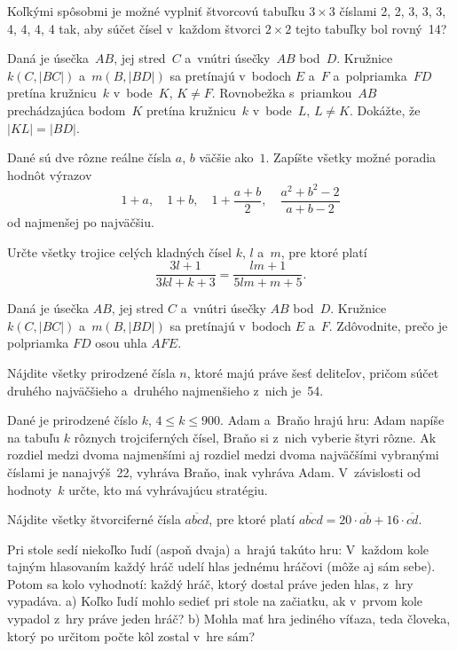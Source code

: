 {%
Koľkými spôsobmi je možné vyplniť štvorcovú tabuľku $3 \times 3$
číslami 2, 2, 3, 3, 3, 4, 4, 4, 4 tak, aby súčet čísel
v~každom štvorci $2 \times 2$ tejto tabuľky bol rovný~14?}

{%
Daná je úsečka~$AB$, jej stred~$C$ a~vnútri úsečky~$AB$ bod~$D$. Kružnice
$k(C, |BC|)$ a~$m(B, |BD|)$ sa pretínajú v~bodoch $E$ a~$F$ a~polpriamka~$FD$ pretína kružnicu~$k$ v~bode~$K$, $K\ne F$. Rovnobežka
s~priamkou~$AB$ prechádzajúca bodom~$K$ pretína kružnicu~$k$ v~bode~$L$, $L \ne K$.
Dokážte, že $|KL| = |BD|$.}

{%
Dané sú dve rôzne reálne čísla $a$, $b$ väčšie ako~$1$. Zapíšte
všetky možné poradia hodnôt výrazov
$$
1+a, \quad 1+b, \quad 1+ \frac {a+b} 2, \quad \frac {a^2+b^2-2} {a+b-2}
$$
od najmenšej po najväčšiu.}

{%
Určte všetky trojice celých kladných čísel $k$, $l$ a~$m$, pre ktoré
platí
$$
\frac {3l+1} {3kl+k+3} = \frac {lm+1} {5lm+m+5}.
$$
}

{%
Daná je úsečka $AB$, jej stred $C$ a~vnútri úsečky $AB$ bod~$D$. Kružnice
$k(C, |BC|)$ a~$m (B, |BD|)$ sa pretínajú v~bodoch $E$ a~$F$. Zdôvodnite,
prečo je polpriamka $FD$ osou uhla $AFE$.}

{%
Nájdite všetky prirodzené čísla $n$, ktoré majú práve šesť deliteľov,
pričom súčet druhého najväčšieho a~druhého najmenšieho z~nich je~54.}

{%
Dané je prirodzené číslo $k$, $4\le k\le900$.
Adam a~Braňo hrajú hru: Adam napíše na tabuľu $k$ rôznych
trojciferných čísel, Braňo si z~nich vyberie štyri rôzne. Ak rozdiel
medzi dvoma najmenšími aj rozdiel medzi dvoma najväčšími vybranými
číslami je nanajvýš~22, vyhráva Braňo, inak vyhráva Adam. V~závislosti
od hodnoty~$k$ určte, kto má vyhrávajúcu stratégiu.}

{%
Nájdite všetky štvorciferné čísla $\overline{abcd}$, pre ktoré platí
$\overline{abcd}=20\cdot\overline{ab}+16\cdot\overline{cd}$.}

{%
Pri stole sedí niekoľko ľudí (aspoň dvaja) a~hrajú takúto hru:
V~každom kole tajným hlasovaním každý hráč udelí hlas jednému
hráčovi (môže aj sám sebe). Potom sa kolo vyhodnotí: každý hráč, ktorý
dostal práve jeden hlas, z~hry vypadáva.
\ite a) Koľko ľudí mohlo sedieť pri stole na začiatku,
ak v~prvom kole vypadol z~hry práve jeden hráč?
\ite b) Mohla mať hra jediného víťaza, teda človeka,
ktorý po určitom počte kôl zostal v~hre sám?\endgraf
}

